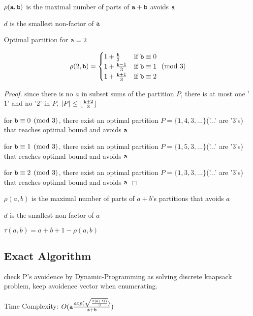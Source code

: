 \begin{definition}
$\rho(\mathtt{a},\mathtt{b})$ is the maximal number of parts of $\mathtt{a}+\mathtt{b}$ avoids $\mathtt{a}$

$d$ is the smallest non-factor of $\mathtt{a}$
\end{definition}

\begin{theorem}
Optimal partition for $\mathtt{a}=2$

\[
 \rho(2,\mathtt{b}) =
   \begin{cases}
     1+\frac{\mathtt{b}}{3}   &\mbox{if }\mathtt{b}\equiv0\\
     1+\frac{\mathtt{b}-1}{3} &\mbox{if }\mathtt{b}\equiv1\\
     1+\frac{\mathtt{b}+1}{3} &\mbox{if }\mathtt{b}\equiv2
   \end{cases}
   \pmod{3}
\]
\end{theorem}

\begin{proof}
	since there is no $a$ in subset sums of the partition $P$, there is at most one '$1$' and no '$2$' in $P$, $|P|\leq \lfloor\frac{\mathtt{b}+2}{3}\rfloor$

	for $\mathtt{b}\equiv0\pmod{3}$, there exist an optimal partition $P=\{1,4,3,...\}$('...' are '$3$'s) that reaches optimal bound and avoids $\mathtt{a}$

	for $\mathtt{b}\equiv1\pmod{3}$, there exist an optimal partition $P=\{1,5,3,...\}$('...' are '$3$'s) that reaches optimal bound and avoids $\mathtt{a}$

	for $\mathtt{b}\equiv2\pmod{3}$, there exist an optimal partition $P=\{1,3,3,...\}$('...' are '$3$'s) that reaches optimal bound and avoids $\mathtt{a}$

\end{proof}

\begin{definition}
$\rho(a,b)$ is the maximal number of parts of $a+b$'s partitions that avoids $a$

$d$ is the smallest non-factor of $a$
\end{definition}

\begin{remark}
$\tau(a,b)=a+b+1-\rho(a,b)$
\end{remark}

\subsection{Exact Algorithm}

\begin{algorithmic}
     
    \ENDIF
  \ENDFOR
\end{algorithmic}
check P's avoidence by Dynamic-Programming as solving discrete knapsack problem, keep avoidence vector when enumerating.

Time Complexity: $O(\mathtt{a}\frac{exp(\sqrt{\frac{2(\mathtt{a}+\mathtt{b}))}{3} } )}{\mathtt{a}+\mathtt{b}})$
